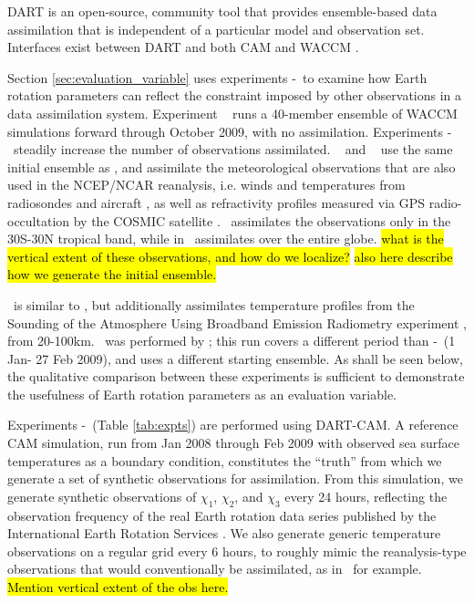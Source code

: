 DART \citep{Anderson2009} is an open-source, community tool that provides ensemble-based data assimilation that is independent of a particular model and observation set.
Interfaces exist between DART and both CAM \citep{Raeder2012} and WACCM \citep{Pedatella2013}.

Section \ref{sec:evaluation_variable} uses experiments \WACCMNODA-\NCARFULL~to examine how Earth rotation parameters can reflect the constraint imposed by other observations in a data assimilation system.  
Experiment \WACCMNODA~ runs a 40-member ensemble of WACCM simulations forward through October 2009, with no assimilation. 
Experiments \WACCMTROPICS-\NCARFULL ~steadily increase the number of observations assimilated. 
\WACCMTROPICS~ and \WACCMGLOBAL~ use the same initial ensemble as \WACCMNODA, and assimilate the meteorological observations that are also used in the NCEP/NCAR reanalysis, i.e. winds and temperatures from radiosondes and aircraft \citep{Saha2010}, as well as refractivity profiles measured via GPS radio-occultation by the COSMIC satellite \citep{Anthes2008}.
\WACCMTROPICS~assimilates the observations only in the 30S-30N tropical band, while in \WACCMGLOBAL~assimilates over the entire globe.
\hl{what is the vertical extent of these observations, and how do we localize?} 
\hl{also here describe how we generate the initial ensemble.}

\NCARFULL ~is similar to \WACCMGLOBAL, but additionally assimilates temperature profiles from the Sounding of the Atmosphere Using Broadband Emission Radiometry experiment \citep[SABER]{Russell2009}, from 20-100km.
\NCARFULL ~was performed by \citet{Pedatella2014}; this run covers a different period than \WACCMNODA-\WACCMTROPICS ~(1 Jan- 27 Feb 2009), and uses a different starting ensemble.  
As shall be seen below, the qualitative comparison between these experiments is sufficient to demonstrate the usefulness of Earth rotation parameters as an evaluation variable. 

Experiments \NODA-\ERPRST ~(Table \ref{tab:expts}) are performed using DART-CAM.  
A reference CAM simulation, run from Jan 2008 through Feb 2009 with observed sea surface temperatures as a boundary condition, constitutes the ``truth'' from which we generate a set of synthetic observations for assimilation. 
From this simulation, we generate synthetic observations of $\chi_1$, $\chi_2$, and $\chi_3$ every 24 hours, reflecting the observation frequency of the real Earth rotation data series published by the International Earth Rotation Services \citep{iers}.  
We also generate generic temperature observations on a regular grid every 6 hours, to roughly mimic the reanalysis-type observations that would conventionally be assimilated, as in \WACCMGLOBAL ~for example. 
\hl{Mention vertical extent of the obs here.}

